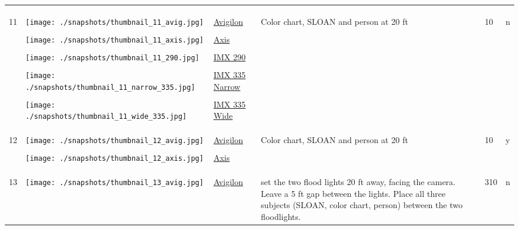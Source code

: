 \documentclass{article}%
\begin{document}
\begin{longtabu}{m{2.5cm} m{4cm} m{2cm} m{4cm} m{2cm} m{2cm}}
&&&&&\\%
&&&&&\\%
\hline%
&&&&&\\%
11&\texttt{[image: ./snapshots/thumbnail\_11\_avig.jpg]}&\href{https://drive.google.com/file/d/1TA8mg0guTv4qlYRPEHv_uCqfUPBe4Vi0/view?usp=sharing}{Avigilon}&Color chart, SLOAN and person at 20 ft&10&n\\%
&&&&&\\%
&\texttt{[image: ./snapshots/thumbnail\_11\_axis.jpg]}&\href{https://drive.google.com/file/d/1f145baq6-oiCN7YpWAnfAIqu7E-dVFes/view?usp=sharing}{Axis}&&&\\%
&&&&&\\%
&\texttt{[image: ./snapshots/thumbnail\_11\_290.jpg]}&\href{https://drive.google.com/file/d/1wVfkQB-EgZEhl_q3vB1dNifu_4RdC5nP/view?usp=sharing}{IMX 290}&&&\\%
&&&&&\\%
&\texttt{[image: ./snapshots/thumbnail\_11\_narrow\_335.jpg]}&\href{https://drive.google.com/file/d/1FYKjAjcLUz87-altLsJ9yHvDV7WGXTED/view?usp=sharing}{IMX 335 Narrow}&&&\\%
&&&&&\\%
&\texttt{[image: ./snapshots/thumbnail\_11\_wide\_335.jpg]}&\href{https://drive.google.com/file/d/1_m1ofb-on9AjmlrGlWbdNJVbdM3sehTP/view?usp=sharing}{IMX 335 Wide}&&&\\%
&&&&&\\%
&&&&&\\%
\hline%
&&&&&\\%
12&\texttt{[image: ./snapshots/thumbnail\_12\_avig.jpg]}&\href{https://drive.google.com/file/d/1Fp85EVAGogtYR1FxtgzUG6glWf4BeYhW/view?usp=sharing}{Avigilon}&Color chart, SLOAN and person at 20 ft&10&y\\%
&&&&&\\%
&\texttt{[image: ./snapshots/thumbnail\_12\_axis.jpg]}&\href{https://drive.google.com/file/d/1j4AIMAGLnTgsWVKESGzzzne5nl5D2h-d/view?usp=sharing}{Axis}&&&\\%
&&&&&\\%
&&&&&\\%
\hline%
&&&&&\\%
13&\texttt{[image: ./snapshots/thumbnail\_13\_avig.jpg]}&\href{https://drive.google.com/file/d/1pXmftF0TeaxWYDagbG5k560e-FQDwkG3/view?usp=sharing}{Avigilon}&set the two flood lights 20 ft away, facing the camera. Leave a 5 ft gap between the lights. Place all three subjects (SLOAN, color chart, person) between the two floodlights.&310&n\\%

\end{longtabu}
\end{document}
